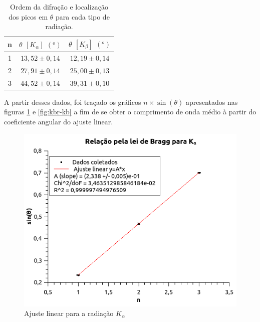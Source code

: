 \documentclass[article,12pt,openright,oneside,a4paper,brazil]{abntex2}
\begin{document}
\begin{table}[H]
    \centering
    \caption{Ordem da difração e localização dos picos em $\theta$ para cada tipo de radiação.}
    \begin{tabular}{|c|c|c|}
        \hline
         n & $\theta$ $[K_\alpha]$ $(^o)$ & $\theta$ $[K_\beta]$ $(^o)$ \\ \hline
         1 & $13,52\pm0,14$ & $12,19\pm0,14$ \\ \hline
         2 & $27,91\pm0,14$ & $25,00\pm0,13$ \\ \hline
         3 & $44,52\pm0,14$ & $39,31\pm0,10$ \\ \hline
    \end{tabular}
    \label{tab:kbr}
\end{table}

A partir desses dados, foi traçado os gráficos $n \times \sin(\theta)$ apresentados nas figuras \ref{fig:kbr-ka} e \ref{fig:kbr-kb} a fim de se obter o comprimento de onda médio à partir do coeficiente angular do ajuste linear.

\begin{figure}[H]
    \centering
    \includegraphics[scale=0.8]{Figuras/Ka.png}
    \caption{Ajuste linear para a radiação $K_\alpha$}
    \label{fig:kbr-ka}
\end{figure}
\end{document}
